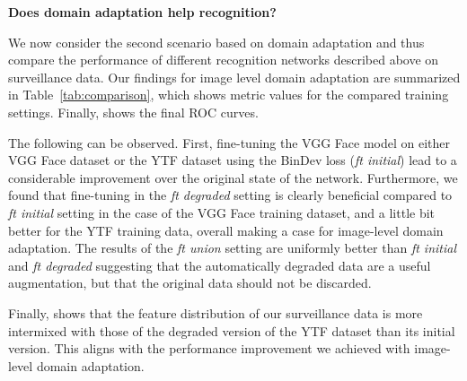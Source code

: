  
  
 
\bigskip\indent\textbf{Does domain adaptation help recognition?}\\
\label{sect:results}

We now consider the second scenario based on domain adaptation and thus compare the performance of different recognition networks described above on surveillance data. Our findings for image level domain adaptation are summarized in Table~\ref{tab:comparison}, which shows metric values for the compared training settings. Finally,  shows the final ROC curves.

The following can be observed. First, fine-tuning the VGG Face model on either VGG Face dataset or the YTF dataset using the BinDev loss (\textit{ft initial}) lead to a considerable improvement over the original state of the network.
Furthermore, we found that fine-tuning in the \textit{ft degraded} setting is clearly beneficial compared to \textit{ft initial} setting in the case of the VGG Face training dataset, and a little bit better for the YTF training data, overall making a case for image-level domain adaptation. The results of the \textit{ft union} setting are uniformly better than \textit{ft initial} and \textit{ft degraded} suggesting that the automatically degraded data are a useful augmentation, but that the original data should not be discarded. 

Finally,  shows that the feature distribution of our surveillance data is more intermixed with those of the degraded version of the YTF dataset than its initial version. This aligns with the performance improvement we achieved with image-level domain adaptation.





